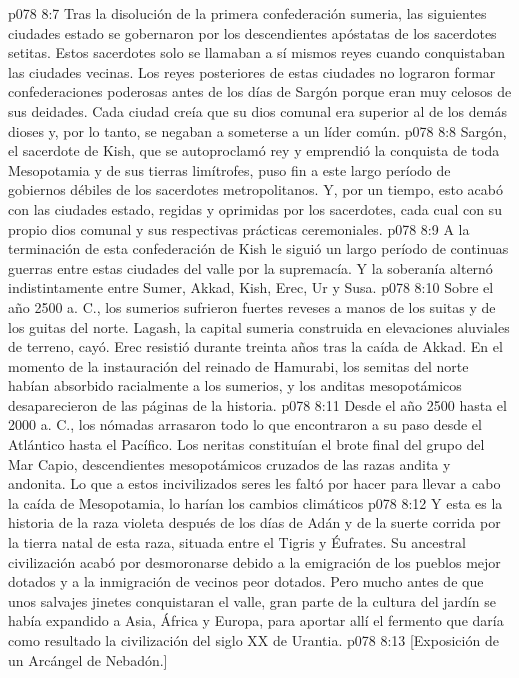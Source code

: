 \vs p078 8:7 Tras la disolución de la primera confederación sumeria, las siguientes ciudades estado se gobernaron por los descendientes apóstatas de los sacerdotes setitas. Estos sacerdotes solo se llamaban a sí mismos reyes cuando conquistaban las ciudades vecinas. Los reyes posteriores de estas ciudades no lograron formar confederaciones poderosas antes de los días de Sargón porque eran muy celosos de sus deidades. Cada ciudad creía que su dios comunal era superior al de los demás dioses y, por lo tanto, se negaban a someterse a un líder común.
\vs p078 8:8 Sargón, el sacerdote de Kish, que se autoproclamó rey y emprendió la conquista de toda Mesopotamia y de sus tierras limítrofes, puso fin a este largo período de gobiernos débiles de los sacerdotes metropolitanos. Y, por un tiempo, esto acabó con las ciudades estado, regidas y oprimidas por los sacerdotes, cada cual con su propio dios comunal y sus respectivas prácticas ceremoniales.
\vs p078 8:9 A la terminación de esta confederación de Kish le siguió un largo período de continuas guerras entre estas ciudades del valle por la supremacía. Y la soberanía alternó indistintamente entre Sumer, Akkad, Kish, Erec, Ur y Susa.
\vs p078 8:10 Sobre el año 2500 a. C., los sumerios sufrieron fuertes reveses a manos de los suitas y de los guitas del norte. Lagash, la capital sumeria construida en elevaciones aluviales de terreno, cayó. Erec resistió durante treinta años tras la caída de Akkad. En el momento de la instauración del reinado de Hamurabi, los semitas del norte habían absorbido racialmente a los sumerios, y los anditas mesopotámicos desaparecieron de las páginas de la historia.
\vs p078 8:11 Desde el año 2500 hasta el 2000 a. C., los nómadas arrasaron todo lo que encontraron a su paso desde el Atlántico hasta el Pacífico. Los neritas constituían el brote final del grupo del Mar Capio, descendientes mesopotámicos cruzados de las razas andita y andonita. Lo que a estos incivilizados seres les faltó por hacer para llevar a cabo la caída de Mesopotamia, lo harían los cambios climáticos
\vs p078 8:12 \pc Y esta es la historia de la raza violeta después de los días de Adán y de la suerte corrida por la tierra natal de esta raza, situada entre el Tigris y Éufrates. Su ancestral civilización acabó por desmoronarse debido a la emigración de los pueblos mejor dotados y a la inmigración de vecinos peor dotados. Pero mucho antes de que unos salvajes jinetes conquistaran el valle, gran parte de la cultura del jardín se había expandido a Asia, África y Europa, para aportar allí el fermento que daría como resultado la civilización del siglo XX de Urantia.
\vsetoff
\vs p078 8:13 [Exposición de un Arcángel de Nebadón.]
